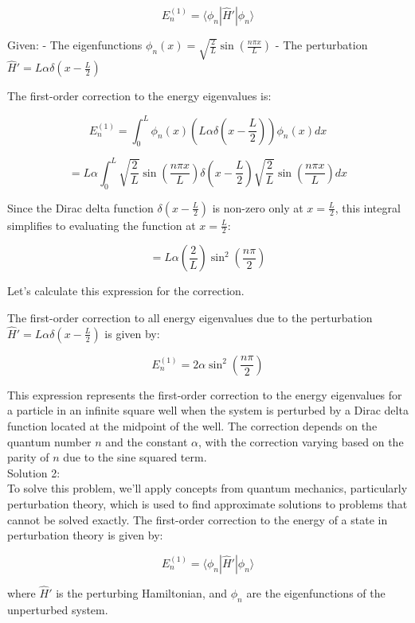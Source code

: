 \documentclass[a4paper,11pt]{article}
\begin{document}
\[ E_n^{(1)} = \langle \phi_n | \hat{H}' | \phi_n \rangle \]

Given:
- The eigenfunctions \( \phi_{n}(x) = \sqrt{\frac{2}{L}} \sin\left(\frac{n \pi x}{L} \right) \)
- The perturbation \( \hat{H}' = L\alpha \delta\left(x - \frac{L}{2} \right) \)

The first-order correction to the energy eigenvalues is:

\[ E_n^{(1)} = \int_0^L \phi_n(x) \left(L\alpha \delta\left(x - \frac{L}{2} \right)\right) \phi_n(x) dx \]

\[ = L\alpha \int_0^L \sqrt{\frac{2}{L}} \sin\left(\frac{n \pi x}{L} \right) \delta\left(x - \frac{L}{2} \right) \sqrt{\frac{2}{L}} \sin\left(\frac{n \pi x}{L} \right) dx \]

Since the Dirac delta function \( \delta\left(x - \frac{L}{2} \right) \) is non-zero only at \( x = \frac{L}{2} \), this integral simplifies to evaluating the function at \( x = \frac{L}{2} \):

\[ = L\alpha \left(\frac{2}{L}\right) \sin^2\left(\frac{n \pi}{2}\right) \]

Let's calculate this expression for the correction.

The first-order correction to all energy eigenvalues due to the perturbation \( \hat{H}' = L\alpha \delta\left(x - \frac{L}{2} \right) \) is given by:

\[ E_n^{(1)} = 2\alpha \sin^2\left(\frac{n \pi}{2}\right) \]

This expression represents the first-order correction to the energy eigenvalues for a particle in an infinite square well when the system is perturbed by a Dirac delta function located at the midpoint of the well. The correction depends on the quantum number \( n \) and the constant \( \alpha \), with the correction varying based on the parity of \( n \) due to the sine squared term. \\ 

\noindent Solution 2: \\

To solve this problem, we'll apply concepts from quantum mechanics, particularly perturbation theory, which is used to find approximate solutions to problems that cannot be solved exactly. The first-order correction to the energy of a state in perturbation theory is given by:

\[ E_n^{(1)} = \langle \phi_n | \hat{H}' | \phi_n \rangle \]

where \(\hat{H}'\) is the perturbing Hamiltonian, and \(\phi_n\) are the eigenfunctions of the unperturbed system.
\end{document}
